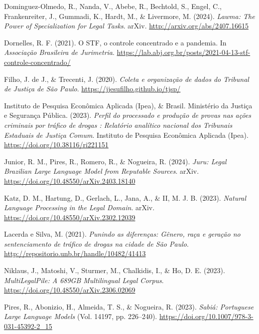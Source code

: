 \documentclass[
  12pt,
]{article}
\newlength{\cslhangindent}
\newenvironment{CSLReferences}[2] %
 {\begin{list}{}{%
  \setlength{\itemindent}{0pt}
  \setlength{\leftmargin}{0pt}
  \setlength{\parsep}{0pt}
  \ifodd #1
   \setlength{\leftmargin}{\cslhangindent}
   \setlength{\itemindent}{-1\cslhangindent}
  \fi
  \setlength{\itemsep}{#2\baselineskip}}}
 {\end{list}}
\begin{document}
\begin{CSLReferences}{1}{0}
Dominguez-Olmedo, R., Nanda, V., Abebe, R., Bechtold, S., Engel, C.,
Frankenreiter, J., Gummadi, K., Hardt, M., \& Livermore, M. (2024).
\emph{Lawma: {The} {Power} of {Specialization} for {Legal} {Tasks}}.
arXiv. \url{http://arxiv.org/abs/2407.16615}

Dornelles, R. F. (2021). O {STF}, o controle concentrado e a pandemia.
In \emph{Associação Brasileira de Jurimetria}.
\url{https://lab.abj.org.br/posts/2021-04-13-stf-controle-concentrado/}

Filho, J. de J., \& Trecenti, J. (2020). \emph{Coleta e organização de
dados do {Tribunal} de {Justiça} de {São} {Paulo}}.
\url{https://jjesufilho.github.io/tjsp/}

Instituto de Pesquisa Econômica Aplicada (Ipea), \& Brasil. Ministério
da Justiça e Segurança Pública. (2023). \emph{Perfil do processado e
produção de provas nas ações criminais por tráfico de drogas : Relatório
analítico nacional dos {Tribunais} {Estaduais} de {Justiça} {Comum}}.
Instituto de Pesquisa Econômica Aplicada (Ipea).
\url{https://doi.org/10.38116/ri221151}

Junior, R. M., Pires, R., Romero, R., \& Nogueira, R. (2024).
\emph{Juru: {Legal} {Brazilian} {Large} {Language} {Model} from
{Reputable} {Sources}}. arXiv.
\url{https://doi.org/10.48550/arXiv.2403.18140}

Katz, D. M., Hartung, D., Gerlach, L., Jana, A., \& II, M. J. B. (2023).
\emph{Natural {Language} {Processing} in the {Legal} {Domain}}. arXiv.
\url{https://doi.org/10.48550/arXiv.2302.12039}

Lacerda e Silva, M. (2021). \emph{Punindo as diferenças: {Gênero}, raça
e geração no sentenciamento de tráfico de drogas na cidade de {São}
{Paulo}}. \url{http://repositorio.unb.br/handle/10482/41413}

Niklaus, J., Matoshi, V., Sturmer, M., Chalkidis, I., \& Ho, D. E.
(2023). \emph{{MultiLegalPile}: {A} {689GB} {Multilingual} {Legal}
{Corpus}}. \url{https://doi.org/10.48550/arXiv.2306.02069}

Pires, R., Abonizio, H., Almeida, T. S., \& Nogueira, R. (2023).
\emph{Sabiá: {Portuguese} {Large} {Language} {Models}} (Vol. 14197, pp.
226--240). \url{https://doi.org/10.1007/978-3-031-45392-2_15}


\end{CSLReferences}
\end{document}
